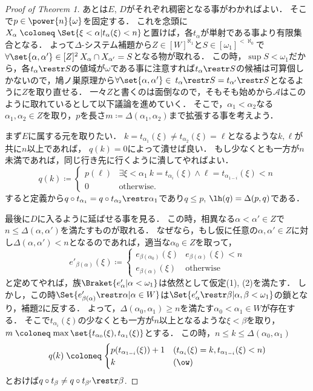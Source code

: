 \documentclass[a4j]{ltjsarticle}
\renewcommand{\defeq}{\mathrel{\coloneq}}
\begin{document}
\begin{proof}[Proof of Theorem 1]
 あとは$E$, $D$がそれぞれ稠密となる事がわかればよい．
 そこで$p \in \power{n}{\omega}$を固定する．
 これを念頭に$X_\alpha \defeq \Set{\xi < \alpha | t_{\alpha}(\xi) < n}$と置けば，各$t_\alpha$が単射である事より有限集合となる．
 よって$\Delta$-システム補題から$Z \in [W]^{\aleph_1}$と$S \in [\omega_1]^{<\aleph_0}$で
 $\forall \set{\alpha, \alpha'} \in [Z]^2\: X_\alpha \cap X_{\alpha'} = S$となる物が取れる．
 この時，$\sup S < \omega_1$だから，各$t_\alpha \restr S$の値域が$\omega$である事に注意すれば$t_\alpha \restr S$の候補は可算個しかないので，鳩ノ巣原理から$\forall \set{\alpha, \alpha'} \in  \: t_\alpha \restr S = t_{\alpha'} \restr S$となるように$Z$を取り直せる．
 一々$Z$と書くのは面倒なので，そもそも始めから$\mathcal{A}$はこのように取れているとして以下議論を進めていく．
 そこで，$\alpha_1 < \alpha_2$なる$\alpha_1, \alpha_2 \in Z$を取り，$p$を長さ$m \defeq \Delta(\alpha_1, \alpha_2)$まで拡張する事を考えよう．

 まず$E$に属する元を取りたい．
 $k = t_{\alpha_1}(\xi) \neq t_{\alpha_2}(\xi) = \ell$となるような$k, \ell$が共に$n$以上であれば，
 $q(k) = 0$によって潰せば良い．
 もし少なくとも一方が$n$未満であれば，同じ行き先に行くように潰してやればよい．
 \[
  q(k) \defeq \begin{cases}
               p(\ell) & \exists \xi < \alpha_1 \: k = t_{\alpha_i}(\xi) \wedge \ell = t_{\alpha_{1-i}}(\xi) < n\\
               0 & \text{otherwise}.
              \end{cases}
 \]
 すると定義から$q \circ t_{\alpha_1} = q \circ t_{\alpha_2} \restr \alpha_1$であり$q \leq p$, $\lh(q) = \Delta(p, q)$である．

 最後に$D$に入るように延ばせる事を見る．
 この時，相異なる$\alpha < \alpha' \in Z$で$n \leq \Delta(\alpha, \alpha')$を満たすものが取れる．
 なぜなら，もし仮に任意の$\alpha, \alpha' \in Z$に対し$\Delta(\alpha, \alpha') < n$となるのであれば，適当な$\alpha_0 \in Z$を取って，
 \[
  e'_{\beta(\alpha)}(\xi) \defeq \begin{cases}
                                  e_{\beta(\alpha_0)}(\xi) & e_{\beta(\alpha)}(\xi) < n\\
                                  e_{\beta(\alpha)}(\xi)   & \text{otherwise}
                                 \end{cases}
 \]
 と定めてやれば，族$\Braket{e'_\alpha | \alpha < \omega_1}$は依然として仮定(1), (2)を満たす．
 しかし，この時$\Set{e'_{\beta(\alpha)} \restr \alpha | \alpha \in W}$は$\Set{e'_\alpha \restr \beta | \alpha, \beta < \omega_1}$の鎖となり，補題2に反する．
 よって，$\Delta(\alpha_0, \alpha_1) \geq n$を満たす$\alpha_0 < \alpha_1 \in W$が存在する．
 そこで$t_{\alpha_i}(\xi)$の少なくとも一方が$n$以上となるような$\xi < \beta$を取り，$m \defeq \max\set{t_{\alpha_0}(\xi), t_{\alpha_1}(\xi)}$とする．
 この時，$n \leq k \leq \Delta(\alpha_0, \alpha_1)$
 \[
  q(k) \defeq
  \begin{cases}
   p(t_{\alpha_{1-i}}(\xi)) + 1 & (t_{\alpha_i}(\xi) = k, t_{\alpha_{1-i}}(\xi) < n)\\
   k & (\ow)
 \end{cases}
 \]
 とおけば$q \circ t_\beta \neq q \circ t_{\beta'} \restr \beta$.


\end{proof}
\end{document}
